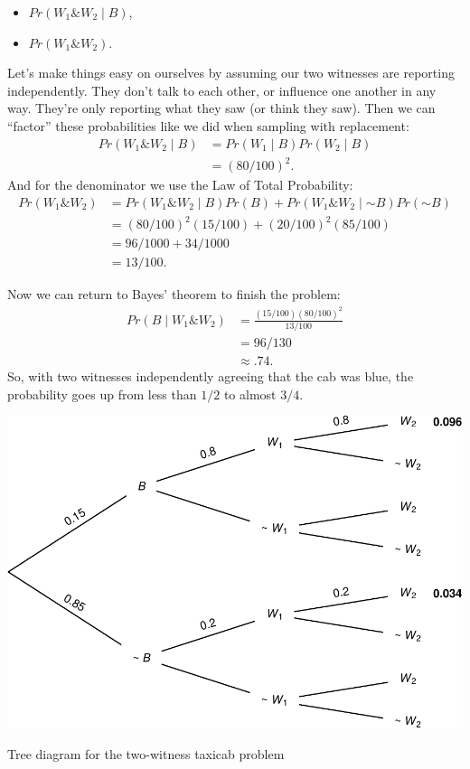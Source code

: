 \documentclass[justified]{tufte-book}
\providecommand{\tightlist}{%
  \setlength{\itemsep}{0pt}\setlength{\parskip}{0pt}}
\newcommand{\given}{\mid}
\renewcommand{\neg}{\mathbin{\sim}}
\renewcommand{\wedge}{\mathbin{\&}}
\newcommand{\p}{Pr}
\theoremstyle{definition}
\theoremstyle{definition}
\theoremstyle{definition}
\theoremstyle{remark}
\begin{document}
\begin{itemize}
\tightlist
\item
  \(\p(W_1 \wedge W_2 \given B)\),
\item
  \(\p(W_1 \wedge W_2)\).
\end{itemize}

Let's make things easy on ourselves by assuming our two witnesses are reporting independently. They don't talk to each other, or influence one another in any way. They're only reporting what they saw (or think they saw). Then we can ``factor'' these probabilities like we did when sampling with replacement:
\[
  \begin{aligned}
    \p(W_1 \wedge W_2 \given B) &= \p(W_1 \given B) \p(W_2 \given B)\\
                                &= (80/100)^2.
  \end{aligned}
\]
And for the denominator we use the Law of Total Probability:
\[
  \begin{aligned}
    \p(W_1 \wedge W_2) &= \p(W_1 \wedge W_2 \given B)\p(B) + 
                          \p(W_1 \wedge W_2 \given \neg B)\p(\neg B)\\
                       &= (80/100)^2(15/100) + (20/100)^2(85/100)\\
                       &= 96/1000 + 34/1000\\
                       &= 13/100.
  \end{aligned}
\]

Now we can return to Bayes' theorem to finish the problem:
\[
  \begin{aligned}
    \p(B \given W_1 \wedge W_2) &= \frac{(15/100)(80/100)^2}{13/100}\\
                                &= 96/130\\
                                &\approx .74.
  \end{aligned}
\]
So, with two witnesses independently agreeing that the cab was blue, the probability goes up from less than \(1/2\) to almost \(3/4\).

\begin{marginfigure}
\includegraphics{_main_files/figure-latex/twowitnesstree-1} \caption[Tree diagram for the two-witness taxicab problem]{Tree diagram for the two-witness taxicab problem}\label{fig:twowitnesstree}
\end{marginfigure}
\end{document}
